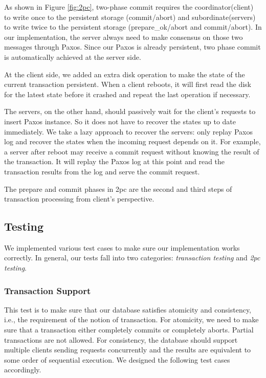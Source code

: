 \documentclass{vldb}
\begin{document}
As shown in Figure \ref{fig:2pc}, two-phase commit requires the coordinator(client)
to write once to the persistent storage (commit/abort) and subordinate(servers) to
write twice to the persistent storage (prepare\_ok/abort and commit/abort). In our
implementation, the server always need to make consensus on those two messages
through Paxos. Since our Paxos is already persistent, two phase commit is
automatically achieved at the server side. 

At the client side, we added an extra disk operation to make the state of the current
transaction persistent. When a client reboots, it will first read the disk for the
latest state before it crashed and repeat the last operation if necessary. 

The servers, on the other hand, should passively wait for the client’s requests to
insert Paxos instance. So it does not have to recover the states up to date
immediately. We take a lazy approach to recover the servers: only replay Paxos log
and recover the states when the incoming request depends on it. For example, a server
after reboot may receive a commit request without knowing the result of the
transaction. It will replay the Paxos log at this point and read the transaction
results from the log and serve the commit request.

The prepare and commit phases in 2pc are the second and third steps of transaction
processing from client's perspective.



\subsection{Testing}

We implemented various test cases to make sure our implementation 
works correctly. In general, our tests fall into two categories: 
\textit{transaction testing} and \textit{2pc testing}. 

\subsubsection{Transaction Support}

This test is to make sure that our database satisfies atomicity and 
consistency, i.e., the requirement of the notion of transaction. For 
atomicity, we need to make sure that a transaction either completely 
commits or completely aborts. Partial transactions are not allowed.  
For consistency, the database should support multiple clients sending 
requests concurrently and the results are equivalent to some order of 
sequential execution. We designed the following test cases 
accordingly.
\end{document}
